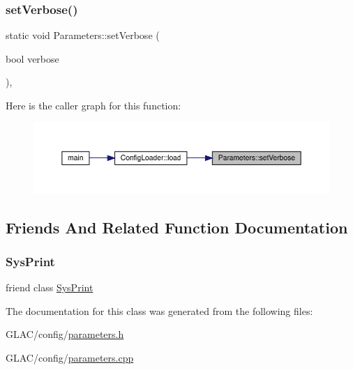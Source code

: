 \subsubsection{\texorpdfstring{setVerbose()}{setVerbose()}}
{\footnotesize\ttfamily static void Parameters\+::set\+Verbose (\begin{DoxyParamCaption}\item[{bool}]{verbose }\end{DoxyParamCaption})\hspace{0.3cm}{\ttfamily [inline]}, {\ttfamily [static]}}

Here is the caller graph for this function\+:
\nopagebreak
\begin{figure}[H]
\begin{center}
\leavevmode
\includegraphics[width=350pt]{class_parameters_aa0ac9d09db506844758e0a5d23dedeb4_icgraph}
\end{center}
\end{figure}


\subsection{Friends And Related Function Documentation}
\mbox{\label{class_parameters_aa0fdc1e103aea3a32f97ca2009dda3e6}} 
\subsubsection{\texorpdfstring{SysPrint}{SysPrint}}
{\footnotesize\ttfamily friend class \mbox{\hyperlink{class_sys_print}{Sys\+Print}}\hspace{0.3cm}{\ttfamily [friend]}}



The documentation for this class was generated from the following files\+:\begin{DoxyCompactItemize}
\item 
G\+L\+A\+C/config/\mbox{\hyperlink{parameters_8h}{parameters.\+h}}\item 
G\+L\+A\+C/config/\mbox{\hyperlink{parameters_8cpp}{parameters.\+cpp}}\end{DoxyCompactItemize}
